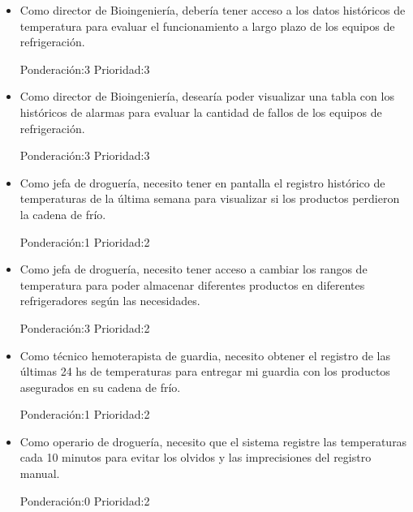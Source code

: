 \documentclass[11pt]{proyecto}
\begin{document}
\begin{itemize}
\item Como director de Bioingeniería, debería tener acceso a los datos históricos de temperatura para evaluar el funcionamiento a largo plazo de los equipos de refrigeración. 

Ponderación:3 Prioridad:3
\end{itemize}

\begin{itemize}
\item Como director de Bioingeniería, desearía poder visualizar una tabla con los históricos de alarmas para evaluar la cantidad de fallos de los equipos de refrigeración. 

Ponderación:3 Prioridad:3
\end{itemize}


\begin{itemize}
\item Como jefa de droguería, necesito tener en pantalla el registro histórico de temperaturas de la última semana para visualizar si los productos perdieron la cadena de frío. 

Ponderación:1 Prioridad:2
\end{itemize}

\begin{itemize}
\item Como jefa de droguería, necesito tener acceso a cambiar los rangos de temperatura para poder almacenar diferentes productos en diferentes refrigeradores según las necesidades. 

Ponderación:3 Prioridad:2
\end{itemize}

\begin{itemize}
\item Como técnico hemoterapista de guardia, necesito obtener el registro de las últimas 24 hs de temperaturas para entregar mi guardia con los productos asegurados en su cadena de frío. 

Ponderación:1 Prioridad:2
\end{itemize}

\begin{itemize}
\item Como operario de droguería, necesito que el sistema registre las temperaturas cada 10 minutos para evitar los olvidos y las imprecisiones del registro manual. 

Ponderación:0 Prioridad:2
\end{itemize}
\end{document}
